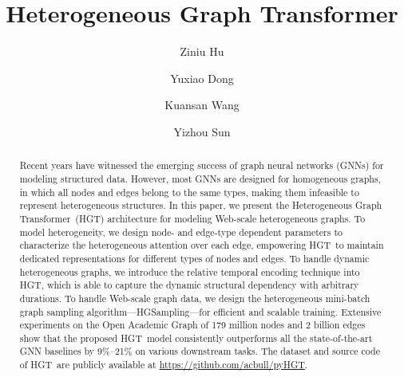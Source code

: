 \documentclass[sigconf]{acmart}
\theoremstyle{definition}
\newcommand{\model}{Heterogeneous Graph Transformer}
\newcommand{\short}{HGT}
\newcommand{\sampling}{HGSampling}
\begin{document}
\title{Heterogeneous Graph Transformer}


\author{Ziniu Hu}


\author{Yuxiao Dong}

\author{Kuansan Wang}

\author{Yizhou Sun}



\begin{abstract}
Recent years have witnessed the emerging success of graph neural networks (GNNs) for modeling structured data. 
However, most GNNs are designed for homogeneous graphs, in which all nodes and edges belong to the same types, making them infeasible to represent  heterogeneous structures. 
In this paper, we present the \model\ (\short) architecture for modeling Web-scale heterogeneous graphs. 
To model heterogeneity, we design node- and edge-type dependent parameters to characterize the heterogeneous attention over each edge, empowering \short\ to maintain dedicated representations for different types of nodes and edges. 
To handle dynamic heterogeneous graphs, we introduce the relative temporal encoding technique into \short, which is able to capture the dynamic structural dependency with arbitrary durations. 
To handle Web-scale graph data, we design the heterogeneous mini-batch graph sampling algorithm---\sampling---for efficient and scalable training. 
Extensive experiments on the Open Academic Graph of 179 million nodes and 2 billion edges show that the proposed \short\ model consistently outperforms all the state-of-the-art GNN baselines by 9$\%$--21$\%$ on various downstream tasks. The dataset and source code of \short\ are publicly available at \url{https://github.com/acbull/pyHGT}. 




\end{abstract}
\end{document}

